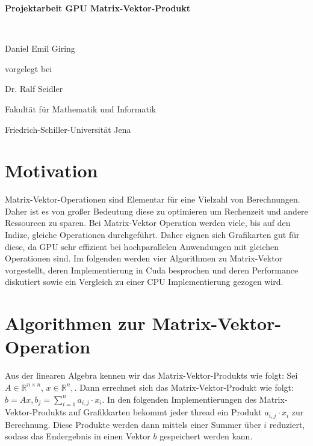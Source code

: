 \documentclass[10pt,a4paper]{article}
\begin{document}
	\begin{center}
		\begin{LARGE}
			\vspace*{1.5cm}
			\textbf{
				Projektarbeit GPU Matrix-Vektor-Produkt
			}
		\end{LARGE}
		\\ \vspace{1.5cm}
		\begin{large}
			Daniel Emil Giring
			\vfill
		\end{large}
		\begin{normalsize}
			vorgelegt bei\\ \vspace{1.5cm}
		\end{normalsize}
		\begin{normalsize}
			Dr. Ralf Seidler
			\\ \vspace{1.5cm}
			
			Fakultät für Mathematik und Informatik\\
		\end{normalsize}
		\vfill%
		\begin{figure}[h]
			\centering
			\centering
		\end{figure}
		\vfill%
		Friedrich-Schiller-Universität Jena
		\\ \vfill%
	\end{center}
	
	\newpage
	\tableofcontents
	\newpage
	\section{Motivation}
	Matrix-Vektor-Operationen sind Elementar für eine Vielzahl von Berechnungen. Daher ist es von großer Bedeutung diese zu optimieren um Rechenzeit und andere Ressourcen zu sparen. Bei Matrix-Vektor Operation werden viele, bis auf den Indize, gleiche Operationen durchgeführt. Daher eignen sich Grafikarten gut für diese, da GPU sehr effizient bei hochparallelen Anwendungen mit gleichen Operationen sind. Im folgenden werden vier Algorithmen zu Matrix-Vektor vorgestellt, deren Implementierung in Cuda besprochen und deren Performance diskutiert sowie ein Vergleich zu einer CPU Implementierung gezogen wird.
	\section{Algorithmen zur Matrix-Vektor-Operation}
	Aus der linearen Algebra kennen wir das Matrix-Vektor-Produkts wie folgt: Sei $A \in \mathbb{R}^{n\times n}$, $x\in \mathbb{R}^n,$. Dann errechnet sich das Matrix-Vektor-Produkt wie folgt: $ b=Ax, b_j=\sum_{i=1}^n a_{i,j} \cdot x_i$. In den folgenden Implementierungen des Matrix-Vektor-Produkts auf Grafikkarten bekommt jeder thread ein Produkt $a_{i,j}\cdot x_i$ zur Berechnung. Diese Produkte werden dann mittels einer Summer über $i$ reduziert, sodass das Endergebnis in einen Vektor $b$ gespeichert werden kann.
\end{document}
